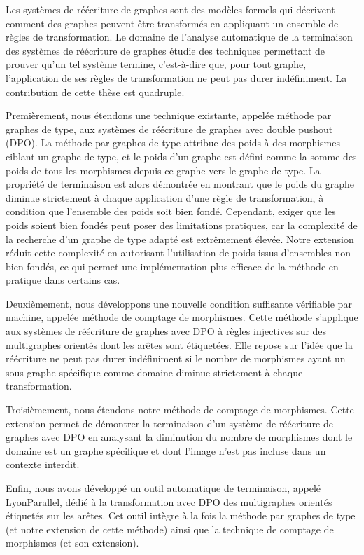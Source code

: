 Les systèmes de réécriture de graphes sont des modèles formels qui décrivent comment des graphes peuvent être transformés en appliquant un ensemble de règles de transformation. Le domaine de l'analyse automatique de la terminaison des systèmes de réécriture de graphes étudie des techniques permettant de prouver qu'un tel système termine, c'est-à-dire que, pour tout graphe, l'application de ses règles de transformation ne peut pas durer indéfiniment. La contribution de cette thèse est quadruple.

Premièrement, nous étendons une technique existante, appelée méthode par graphes de type, aux systèmes de réécriture de graphes avec double pushout (DPO). La méthode par graphes de type attribue des poids à des morphismes ciblant un graphe de type, et le poids d'un graphe est défini comme la somme des poids de tous les morphismes depuis ce graphe vers le graphe de type. La propriété de terminaison est alors démontrée en montrant que le poids du graphe diminue strictement à chaque application d'une règle de transformation, à condition que l'ensemble des poids soit bien fondé. Cependant, exiger que les poids soient bien fondés peut poser des limitations pratiques, car la complexité de la recherche d'un graphe de type adapté est extrêmement élevée. Notre extension réduit cette complexité en autorisant l'utilisation de poids issus d'ensembles non bien fondés, ce qui permet une implémentation plus efficace de la méthode en pratique dans certains cas.

Deuxièmement, nous développons une nouvelle condition suffisante vérifiable par machine, appelée méthode de comptage de morphismes. Cette méthode s'applique aux systèmes de réécriture de graphes avec DPO à règles injectives sur des multigraphes orientés dont les arêtes sont étiquetées. Elle repose sur l'idée que la réécriture ne peut pas durer indéfiniment si le nombre de morphismes ayant un sous-graphe spécifique comme domaine diminue strictement à chaque transformation.

Troisièmement, nous étendons notre méthode de comptage de morphismes. Cette extension permet de démontrer la terminaison d'un système de réécriture de graphes avec DPO en analysant la diminution du nombre de morphismes dont le domaine est un graphe spécifique et dont l'image n'est pas incluse dans un contexte interdit.

Enfin, nous avons développé un outil automatique de terminaison, appelé LyonParallel, dédié à la transformation avec DPO des multigraphes orientés étiquetés sur les arêtes. Cet outil intègre à la fois la méthode par graphes de type (et notre extension de cette méthode) ainsi que la technique de comptage de morphismes (et son extension).